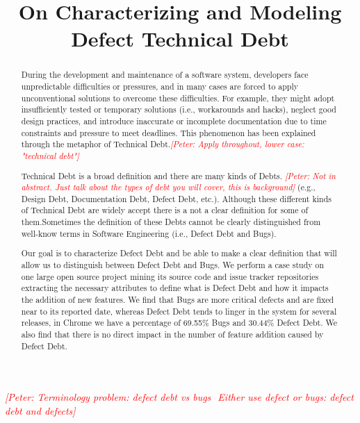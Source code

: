 \documentclass[conference]{IEEEtran}
\newcommand{\peter}[1]{\textcolor{red}{{\it [Peter: #1]}}}
\begin{document}
\title{On Characterizing and Modeling Defect Technical Debt}

\author{

}

\maketitle

\peter{Terminology problem: defect debt vs bugs  Either use defect or bugs: defect debt and defects}
\begin{abstract}
During the development and maintenance of a software system, developers face unpredictable difficulties or pressures, and in many cases are forced to apply unconventional solutions to overcome these difficulties. For example, they might adopt insufficiently tested or temporary solutions (i.e., workarounds and hacks), neglect good design practices, and introduce inaccurate or incomplete documentation
due to time constraints and pressure to meet deadlines. This phenomenon has been explained through the metaphor of Technical Debt.\peter{Apply throughout, lower case: "technical debt"}

Technical Debt is a broad definition and there are many kinds of Debts. \peter{Not in abstract. Just talk about the types of debt you will cover, this is background} (e.g., Design Debt, Documentation Debt, Defect Debt, etc.). Although these different kinds of Technical Debt are widely accept there is a not a clear definition for some of them.Sometimes the definition of these Debts cannot be clearly distinguished from well-know terms in Software Engineering (i.e., Defect Debt and Bugs). 

Our goal is to characterize Defect Debt and be able to make a clear definition that will allow us to distinguish between Defect Debt and Bugs. We perform a case study on one large open source project mining its source code and issue tracker repositories extracting the necessary attributes to define what is Defect Debt and how it impacts the addition of new features. We find that Bugs are more critical defects and are fixed near to its reported date, whereas Defect Debt tends to linger in the system for several releases, in Chrome we have a percentage of 69.55\%  Bugs and 30.44\% Defect Debt. We also find that there is no direct impact in the number of feature addition caused by Defect Debt.
  
\end{abstract}
\end{document}
